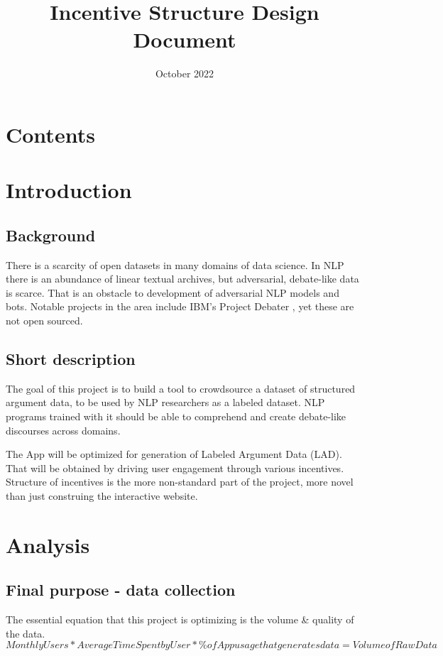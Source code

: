 \documentclass{article}
\title{Incentive Structure Design Document}
\date{October 2022}
\begin{document}
\maketitle
\section*{Contents}
\tableofcontents
\newpage

\section{Introduction}

\subsection*{Background}
There is a scarcity of open datasets in many domains of data science. In NLP there is an abundance of linear textual archives, but adversarial, debate-like data is scarce.
That is an obstacle to development of adversarial NLP models and bots. Notable projects in the area include IBM's Project Debater \cite[]{https://research.ibm.com/interactive/project-debater/}, yet these are not open sourced.

\subsection*{Short description}
The goal of this project is to build a tool to crowdsource a dataset of structured argument data, to be used by NLP researchers as a labeled dataset.
NLP programs trained with it should be able to comprehend and create debate-like discourses across domains.

The App will be optimized for generation of Labeled Argument Data (LAD).
That will be obtained by driving user engagement through various incentives. 
Structure of incentives is the more non-standard part of the project, more novel than just construing the interactive website.

\section{Analysis}
\subsection[]{Final purpose - data collection}
The essential equation that this project is optimizing is the volume & quality of the data.
\begin{equation}
  {Monthly Users} * {Average Time Spent by User} * {\% of App usage that generates data} = {Volume of Raw Data}
\end{equation}
\end{document}
